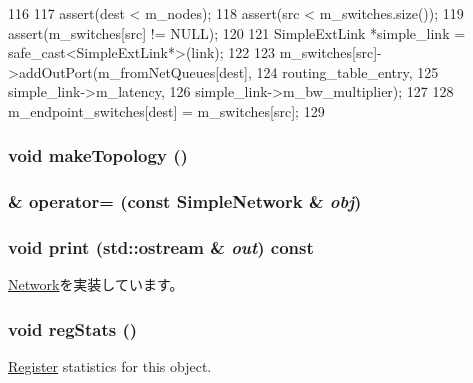 \begin{DoxyCode}
116 {
117     assert(dest < m_nodes);
118     assert(src < m_switches.size());
119     assert(m_switches[src] != NULL);
120 
121     SimpleExtLink *simple_link = safe_cast<SimpleExtLink*>(link);
122 
123     m_switches[src]->addOutPort(m_fromNetQueues[dest],
124                                          routing_table_entry,
125                                          simple_link->m_latency,
126                                          simple_link->m_bw_multiplier);
127 
128     m_endpoint_switches[dest] = m_switches[src];
129 }
\end{DoxyCode}
\hypertarget{classSimpleNetwork_a6f69a0a7780a760ca9556e4e801c0a44}{
\subsubsection[{makeTopology}]{\setlength{\rightskip}{0pt plus 5cm}void makeTopology ()}}
\label{classSimpleNetwork_a6f69a0a7780a760ca9556e4e801c0a44}
\hypertarget{classSimpleNetwork_a687133dea31dd57750ef6a35b7a3da7c}{
\subsubsection[{operator=}]{\& operator= (const {\bf SimpleNetwork} \& {\em obj})}}
\label{classSimpleNetwork_a687133dea31dd57750ef6a35b7a3da7c}
\hypertarget{classSimpleNetwork_ac55fe386a101fbae38c716067c9966a0}{
\subsubsection[{print}]{\setlength{\rightskip}{0pt plus 5cm}void print (std::ostream \& {\em out}) const}}
\label{classSimpleNetwork_ac55fe386a101fbae38c716067c9966a0}


\hyperlink{classNetwork_a3ea5f7af5db62cc24f4e40df9ea5c971}{Network}を実装しています。\hypertarget{classSimpleNetwork_a4dc637449366fcdfc4e764cdf12d9b11}{
\subsubsection[{regStats}]{\setlength{\rightskip}{0pt plus 5cm}void regStats ()}}
\label{classSimpleNetwork_a4dc637449366fcdfc4e764cdf12d9b11}
\hyperlink{classRegister}{Register} statistics for this object. 

